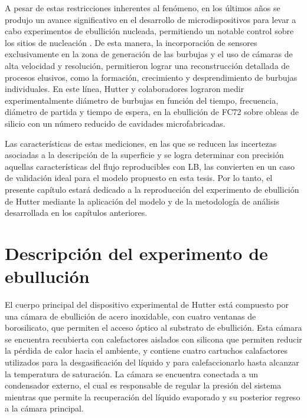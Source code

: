 A pesar de estas restricciones inherentes al fen\'omeno, en los \'ultimos a\~nos se produjo un avance significativo en el desarrollo de microdispositivos para levar a cabo experimentos de ebullici\'on nucleada, permitiendo un notable control sobre los sitios de nucleaci\'on \cite{gregorcic_scalable_2018, liu_experimental_2019}. De esta manera, la incorporaci\'on de sensores exclusivamente en la zona de generaci\'on de las burbujas y el uso de c\'amaras de alta velocidad y resoluci\'on, permitieron lograr una reconstrucci\'on detallada de procesos elusivos, como la formaci\'on, crecimiento y desprendimiento de burbujas individuales. En este l\'inea, Hutter y colaboradores \cite{hutter_experimental_2009, hutter_experimental_2010} lograron medir experimentalmente di\'ametro de burbujas en funci\'on del tiempo, frecuencia, di\'ametro de partida y tiempo de espera, en la ebullici\'on de FC72 sobre obleas de silicio con un n\'umero reducido de cavidades microfabricadas. 

Las caracter\'isticas de estas mediciones, en las que se reducen las incertezas asociadas a la descripci\'on de la superficie y se logra determinar con precisi\'on aquellas caracter\'isticas del flujo reproducibles con LB, las convierten en un caso de validaci\'on ideal para el modelo propuesto en esta tesis. Por lo tanto, el presente cap\'itulo estar\'a dedicado a la reproducci\'on del experimento de ebullici\'on de Hutter mediante la aplicaci\'on del modelo y de la metodolog\'ia de an\'alisis desarrollada en los cap\'itulos anteriores.




\section{Descripci\'on del experimento de ebulluci\'on}

El cuerpo principal del dispositivo experimental de Hutter \cite{hutter_experimental_2010} est\'a compuesto por una c\'amara de ebullici\'on de acero inoxidable, con cuatro ventanas de borosilicato, que permiten el acceso \'optico al substrato de ebullici\'on. Esta c\'amara se encuentra recubierta con calefactores aislados con silicona que permiten reducir la p\'erdida de calor hacia el ambiente, y contiene cuatro cartuchos calafactores utilizados para la desgasificaci\'on del l\'iquido y para calefaccionarlo hasta alcanzar la temperatura de saturaci\'on. La c\'amara se encuentra conectada a un condensador externo, el cual es responsable de regular la presi\'on del sistema mientras que permite la recuperaci\'on del l\'iquido evaporado y su posterior regreso a la c\'amara principal.


